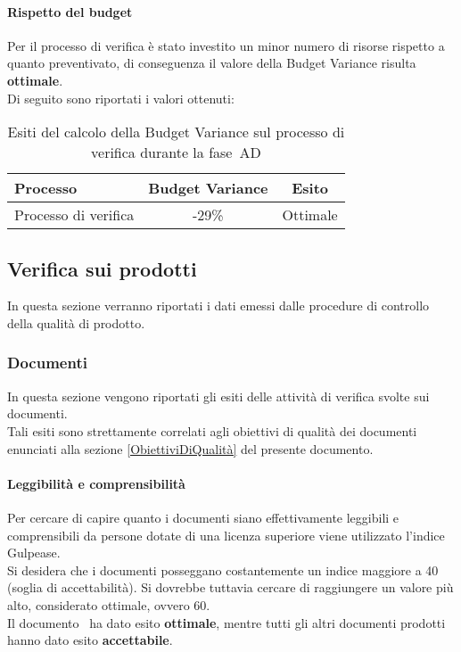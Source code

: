 \documentclass[../PianoDiQualifica.tex]{subfiles}
\begin{document}
\begin{appendices}
			\paragraph{Rispetto del budget}
			Per il processo di verifica è stato investito un minor numero di risorse rispetto a quanto preventivato, di conseguenza il valore della Budget Variance risulta \textbf{ottimale}.\\
			Di seguito sono riportati i valori ottenuti:
			\begin{table}[H]
				\centering
				\begin{tabular}{l * {2}{c}}
					\toprule
					\textbf{Processo} & \textbf{Budget Variance} & \textbf{Esito} \\
					\midrule
					Processo di verifica & -29\% &  Ottimale \\
					\bottomrule
				\end{tabular}
				\caption{Esiti del calcolo della Budget Variance sul processo di verifica durante la fase\g\ AD}
				\label{tab:esiti_budget_variance}
			\end{table}
			
			
	\subsection{Verifica sui prodotti}
	In questa sezione verranno riportati i dati emessi dalle procedure di controllo della qualità di prodotto\g.
		\subsubsection{Documenti}
		In questa sezione vengono riportati gli esiti delle attività di verifica svolte sui documenti.\\
		Tali esiti sono strettamente correlati agli obiettivi di qualità dei documenti enunciati alla sezione \ref{ObiettiviDiQualità} del presente documento.
			
			\paragraph{Leggibilità e comprensibilità}
			Per cercare di capire quanto i documenti siano effettivamente leggibili e comprensibili da persone dotate di una licenza superiore viene utilizzato l’indice Gulpease\g.\\
			Si desidera che i documenti posseggano costantemente un indice maggiore a 40 (soglia di accettabilità). Si dovrebbe tuttavia cercare di raggiungere un valore più alto, considerato ottimale, ovvero 60.\\
			Il documento \glossariov\ ha dato esito \textbf{ottimale}, mentre tutti gli altri documenti prodotti hanno dato esito \textbf{accettabile}.
			

\end{appendices}
\end{document}
